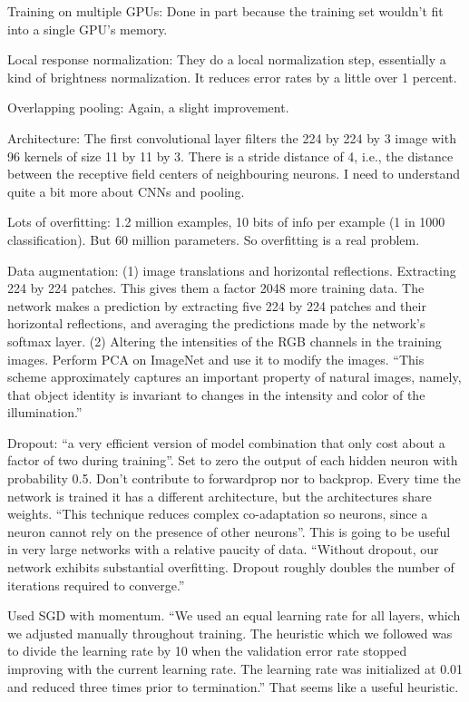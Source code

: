 \documentclass[12pt]{report}
\begin{document}
Training on multiple GPUs: Done in part because the training set
wouldn't fit into a single GPU's memory.

Local response normalization: They do a local normalization step,
essentially a kind of brightness normalization.  It reduces error
rates by a little over 1 percent.

Overlapping pooling: Again, a slight improvement.

Architecture: The first convolutional layer filters the 224 by 224 by
3 image with 96 kernels of size 11 by 11 by 3.  There is a stride
distance of 4, i.e., the distance between the receptive field centers
of neighbouring neurons.  I need to understand quite a bit more about
CNNs and pooling.

Lots of overfitting: 1.2 million examples, 10 bits of info per example
(1 in 1000 classification).  But 60 million parameters.  So
overfitting is a real problem.

Data augmentation: (1) image translations and horizontal reflections.
Extracting 224 by 224 patches.  This gives them a factor 2048 more
training data.  The network makes a prediction by extracting five 224
by 224 patches and their horizontal reflections, and averaging the
predictions made by the network's softmax layer. (2) Altering the
intensities of the RGB channels in the training images.  Perform PCA
on ImageNet and use it to modify the images.  ``This scheme
approximately captures an important property of natural images,
namely, that object identity is invariant to changes in the intensity
and color of the illumination.'' 

Dropout: ``a very efficient version of model combination that only
cost about a factor of two during training''.  Set to zero the output
of each hidden neuron with probability 0.5.  Don't contribute to
forwardprop nor to backprop.  Every time the network is trained it has
a different architecture, but the architectures share weights.  ``This
technique reduces complex co-adaptation so neurons, since a neuron
cannot rely on the presence of other neurons''.  This is going to be
useful in very large networks with a relative paucity of data.
``Without dropout, our network exhibits substantial overfitting.
Dropout roughly doubles the number of iterations required to
converge.''

Used SGD with momentum.  ``We used an equal learning rate for all
layers, which we adjusted manually throughout training.  The heuristic
which we followed was to divide the learning rate by 10 when the
validation error rate stopped improving with the current learning
rate.  The learning rate was initialized at 0.01 and reduced three
times prior to termination.''   That seems like a useful heuristic.
\end{document}
